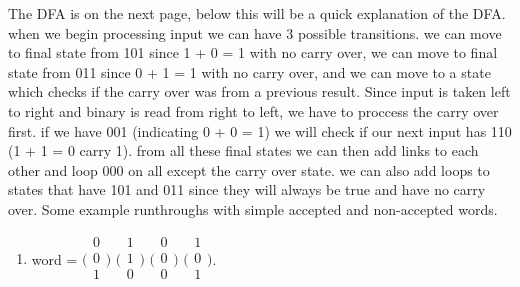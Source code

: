 \documentclass{article}
\begin{document}
The DFA is on the next page, below this will be a quick explanation of the DFA.\\
when we begin processing input we can have 3 possible transitions. we can move to final state from 101 since 1 + 0 = 1 with no carry over, we can move to final state from 011 since 0 + 1 = 1 with no carry over, and we can move to a state which checks if the carry over was from a previous result. Since input is taken left to right and binary is read from right to left, we have to proccess the carry over first. if we have 001 (indicating 0 + 0 = 1) we will check if our next input has 110 (1 + 1 = 0 carry 1). from all these final states we can then add links to each other and loop 000 on all except the carry over state. we can also add loops to states that have 101 and 011 since they will always be true and have no carry over.
Some example runthroughs with simple accepted and non-accepted words.
\begin{enumerate}[1.]
    \item word =
    $\bigl(\begin{smallmatrix}0\\0\\1\\ \end{smallmatrix}\bigr)$
    $\bigl(\begin{smallmatrix}1\\1\\0\\ \end{smallmatrix}\bigr)$
    $\bigl(\begin{smallmatrix}0\\0\\0\\ \end{smallmatrix}\bigr)$
    $\bigl(\begin{smallmatrix}1\\0\\1\\ \end{smallmatrix}\bigr)$.\\
\end{enumerate}
\end{document}
